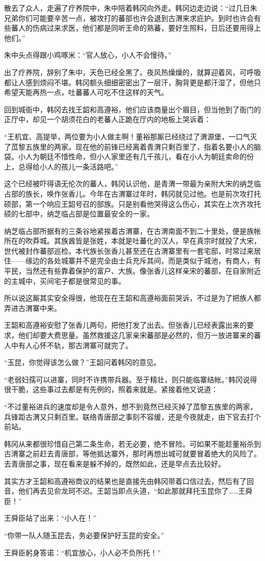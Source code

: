 散去了众人，走遍了疗养院中，朱中陪着韩冈向外走。韩冈边走边说：“过几日朱兄弟你们可能要辛苦一点，被攻打的蕃部也许会退到古渭来求庇护。到时也许会有些蕃人的伤病过来求医，他们都是同听王命的熟蕃，要好生照料，日后还要用得上他们。”

朱中头点得跟小鸡啄米：“官人放心，小人不会慢待。”

出了疗养院，辞别了朱中，天色已经全黑了。夜风热燥燥的，就算迎着风，可呼吸都让人感到烦闷不堪。韩冈额头细细密密出了一层汗，胸背更是都汗湿了，但他只希望天能再热一点，吐蕃蕃人可吃不住这样的天气。

回到城衙中，韩冈去找王韶和高遵裕，他们应该商量出个眉目，但当他到了衙门的正厅中，却见一个胡须花白的老蕃人正跪在厅内的地板上哭诉着：

“王机宜、高提举，两位要为小人做主啊！董裕那厮已经绕过了渭源堡，一口气灭了苽黎五族里的两家。现在他的前锋已经离着青渭只剩百里了，指着名要小人的脑袋。小人为朝廷不惜性命，但小人家里还有几千孩儿，看在小人为朝廷卖命的份上，总得给小人的孩儿一条活路吧。”

这个已经被吓得语无伦次的蕃人，韩冈认识他，是青渭一带最为亲附大宋的纳芝临占部的族长，唤作张香儿。今年在古渭寨过年时，韩冈就见过他。也是前次攻打托硕部，第一个响应王韶号召的部族。只是别看他哭得这么伤心，其实在上次齐攻托硕的七部中，纳芝临占部是位置最安全的一家。

纳芝临占部所据有的三条谷地紧挨着古渭寨，在古渭南面不到二十里处，便是族帐所在的吹莽城。其族酋皆是张姓，本就是吐蕃化的汉人，早在真宗时就投了大宋，世代被封作蕃部巡检。本代族长张香儿甚至还在古渭寨里有一套宅邸，时常过来居住——缘边的各处城寨并不是完全由士兵充斥其间，而是类似于城池，有商人，有平民，当然还有些靠着保护的富户、大族。像张香儿这样亲宋的蕃部，在自家附近的主城中，买间宅子都是很常见的事。

所以说这厮其实安全得很，他现在在王韶和高遵裕面前哭诉，不过是为了把族人都弄进古渭寨中来。

王韶和高遵裕安慰了张香儿两句，把他打发了出去。但张香儿已经表露出来的要求，他们却要大费思量。虽然救援这几家亲宋蕃部是必然的，但万一放进寨来的蕃人中有人心怀不轨，那古渭寨可就完了。

“玉昆，你觉得该怎么做？”王韶问着韩冈的意见。

“老弱妇孺可以进寨，同时不许携带兵器。至于精壮，则只能临寨结帐。”韩冈说得很干脆，这些事过去都是有先例的，照着来就是。紧接着他又说道：

“不过董裕进兵的速度却是令人意外，想不到竟然已经灭掉了苽黎五族里的两家，兵锋距古渭又只剩百里。联络青唐部之事刻不容缓，还是今夜就走，由下官去打个前站。

韩冈从来都很珍惜自己第二条生命，若无必要，绝不冒险。可如果不能趁董裕杀到古渭寨之前赶去青唐部，等他抵达寨外，那时再想出城可就要冒着绝大的风险了。去青唐部之事，现在看来是躲不掉的，既然如此，还是早点去比较好。

其实方才王韶和高遵裕商议的结果也是直接先由韩冈带着口信过去，然后有了回音，他们再去见俞龙珂不迟。王韶当即点头道，“如此那就拜托玉昆你了……王舜臣！”

王舜臣站了出来：“小人在！”

“你带一队人随玉昆去，务必要保护好玉昆的安全。”

王舜臣躬身答诺：“机宜放心，小人必不负所托！”

